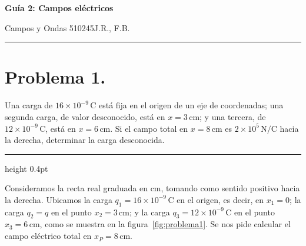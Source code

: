 \documentclass[11pt]{article}
\newcommand{\encabezado}[3]{%
{\Large\bfseries #1\par}
\vspace{2pt}
{\normalsize #2\hfill #3\par}
\vspace{6pt}\hrule\vspace{8pt}}
\newcommand{\soluciontitulo}{%
  \par\medskip
  \noindent{\large\bfseries Solución.}\par
  \vspace{0.2em}\hrule height 0.4pt \vspace{0.7em}%
}
\begin{document}
\encabezado{Guía 2: Campos eléctricos}{Campos y Ondas 510245}{J.R., F.B.}
\shorthandoff{<>}

\section*{Problema 1.}
Una carga de $16\times 10^{-9}\,\mathrm{C}$ está fija en el origen de un eje de coordenadas; una segunda carga, de valor desconocido, está en $x=3\,\mathrm{cm}$; y una tercera, de $12\times 10^{-9}\,\mathrm{C}$, está en $x=6\,\mathrm{cm}$. Si el campo total en $x=8\,\mathrm{cm}$ es $2\times 10^5\,\mathrm{N/C}$ hacia la derecha, determinar la carga desconocida.

\soluciontitulo

Consideramos la recta real graduada en $\mathrm{cm}$, tomando como sentido positivo hacia la derecha. Ubicamos la carga $q_1=16\times 10^{-9}\,\mathrm{C}$ en el origen, es decir, en $x_1=0$; la carga $q_2=q$ en el punto $x_2=3\,\mathrm{cm}$; y la carga $q_3=12\times 10^{-9}\,\mathrm{C}$ en el punto $x_3=6\,\mathrm{cm}$, como se muestra en la figura~\ref{fig:problema1}. Se nos pide calcular el campo eléctrico total en $x_P=8\,\mathrm{cm}$.
\end{document}
